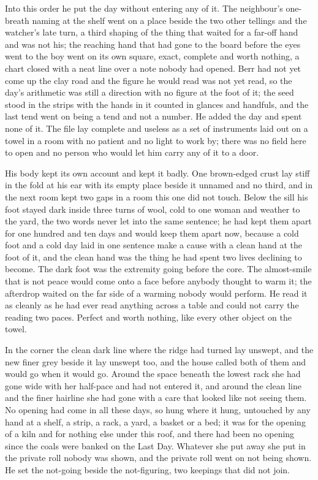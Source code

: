 Into this order he put the day without entering any of it. The neighbour's one-breath naming at the shelf went on a place beside the two other tellings and the watcher's late turn, a third shaping of the thing that waited for a far-off hand and was not his; the reaching hand that had gone to the board before the eyes went to the boy went on its own square, exact, complete and worth nothing, a chart closed with a neat line over a note nobody had opened. Berr had not yet come up the clay road and the figure he would read was not yet read, so the day's arithmetic was still a direction with no figure at the foot of it; the seed stood in the strips with the hands in it counted in glances and handfuls, and the last tend went on being a tend and not a number. He added the day and spent none of it. The file lay complete and useless as a set of instruments laid out on a towel in a room with no patient and no light to work by; there was no field here to open and no person who would let him carry any of it to a door.

His body kept its own account and kept it badly. One brown-edged crust lay stiff in the fold at his ear with its empty place beside it unnamed and no third, and  in the next room kept two gaps in a room this one did not touch. Below the sill his foot stayed dark inside three turns of wool, cold to one woman and weather to the yard, the two words never let into the same sentence; he had kept them apart for one hundred and ten days and would keep them apart now, because a cold foot and a cold day laid in one sentence make a cause with a clean hand at the foot of it, and the clean hand was the thing he had spent two lives declining to become. The dark foot was the extremity going before the core. The almost-smile that is not peace would come onto a face before anybody thought to warm it; the afterdrop waited on the far side of a warming nobody would perform. He read it as cleanly as he had ever read anything across a table and could not carry the reading two paces. Perfect and worth nothing, like every other object on the towel.

In the corner the clean dark line where the  ridge had turned lay unswept, and the new finer grey beside it lay unswept too, and the house called both of them  and would go when it would go. Around the space beneath the lowest rack she had gone wide with her half-pace and had not entered it, and around the clean line and the finer hairline she had gone with a care that looked like not seeing them. No opening had come in all these days, so  hung where it hung, untouched by any hand at a shelf, a strip, a rack, a yard, a basket or a bed; it was for the opening of a kiln and for nothing else under this roof, and there had been no opening since the coals were banked on the Last Day. Whatever she put away she put in the private roll nobody was shown, and the private roll went on not being shown. He set the not-going beside the not-figuring, two keepings that did not join.


